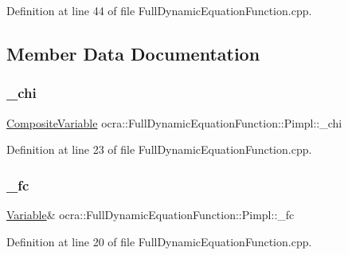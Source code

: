 Definition at line 44 of file Full\+Dynamic\+Equation\+Function.\+cpp.



\subsection{Member Data Documentation}
\hypertarget{structFullDynamicEquationFunction_1_1Pimpl_a795bb07591fdf52c4b60cccfb6b3e811}{}\label{structFullDynamicEquationFunction_1_1Pimpl_a795bb07591fdf52c4b60cccfb6b3e811} 
\subsubsection{\texorpdfstring{\+\_\+chi}{\_chi}}
{\footnotesize\ttfamily \hyperlink{classocra_1_1CompositeVariable}{Composite\+Variable} ocra\+::\+Full\+Dynamic\+Equation\+Function\+::\+Pimpl\+::\+\_\+chi}



Definition at line 23 of file Full\+Dynamic\+Equation\+Function.\+cpp.

\hypertarget{structFullDynamicEquationFunction_1_1Pimpl_ab19caa3b14b35bba6a5dc5ea490cb7b4}{}\label{structFullDynamicEquationFunction_1_1Pimpl_ab19caa3b14b35bba6a5dc5ea490cb7b4} 
\subsubsection{\texorpdfstring{\+\_\+fc}{\_fc}}
{\footnotesize\ttfamily \hyperlink{classocra_1_1Variable}{Variable}\& ocra\+::\+Full\+Dynamic\+Equation\+Function\+::\+Pimpl\+::\+\_\+fc}



Definition at line 20 of file Full\+Dynamic\+Equation\+Function.\+cpp.

\hypertarget{structFullDynamicEquationFunction_1_1Pimpl_a66a532ac843e6bb0255918262e48a947}{}\label{structFullDynamicEquationFunction_1_1Pimpl_a66a532ac843e6bb0255918262e48a947} 
